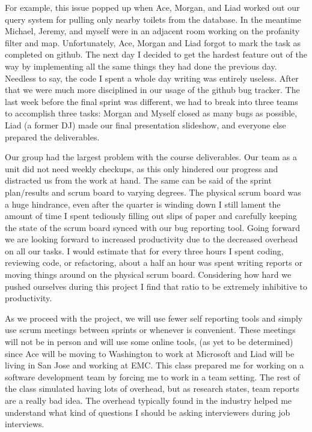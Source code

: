 \documentclass{article}
\begin{document}
For example, this issue popped up when Ace, Morgan, and Liad worked out our query system for pulling only nearby toilets from the database.
In the meantime Michael, Jeremy, and myself were in an adjacent room working on the profanity filter and map.
Unfortunately, Ace, Morgan and Liad forgot to mark the task as completed on github.
The next day I decided to get the hardest feature out of the way by implementing all the same things they had done the previous day.
Needless to say, the code I spent a whole day writing was entirely useless.
After that we were much more disciplined in our usage of the github bug tracker.
The last week before the final sprint was different, we had to break into three teams to accomplish three tasks: Morgan and Myself closed as many bugs as possible, Liad (a former DJ) made our final presentation slideshow, and everyone else prepared the deliverables.
\par
Our group had the largest problem with the course deliverables.
Our team as a unit did not need weekly checkups, as this only hindered our progress and distracted us from the work at hand.
The same can be said of the sprint plan/results and scrum board to varying degrees.
The physical scrum board was a huge hindrance, even after the quarter is winding down I still lament the amount of time I spent tediously filling out slips of paper and carefully keeping the state of the scrum board synced with our bug reporting tool.
Going forward we are looking forward to increased productivity due to the decreased overhead on all our tasks.
I would estimate that for every three hours I spent coding, reviewing code, or refactoring, about a half an hour was spent writing reports or moving things around on the physical scrum board.
Considering how hard we pushed ourselves during this project I find that ratio to be extremely inhibitive to productivity.
\par
As we proceed with the project, we will use fewer self reporting tools and simply use scrum meetings between sprints or whenever is convenient.
These meetings will not be in person and will use some online tools, (as yet to be determined) since Ace will be moving to Washington to work at Microsoft and Liad will be living in San Jose and working at EMC.
This class prepared me for working on a software development team by forcing me to work in a team setting.
The rest of the class simulated having lots of overhead, but as research states, team reports are a really bad idea. 
The overhead typically found in the industry helped me understand what kind of questions I should be asking interviewers during job interviews.
\end{document}
